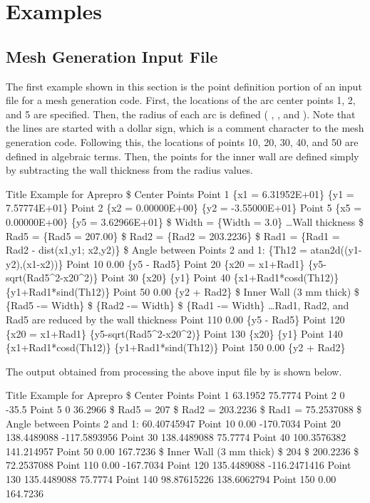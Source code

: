 \chapter{Examples}\label{ch:examples}

\section{Mesh Generation Input File}

The first example shown in this section is the point definition portion of an input 
file for a mesh generation code. First, the locations of the arc center points 
1, 2, and 5 are specified. Then, the radius of each arc is defined ( , 
, and ). Note that the lines are started with a dollar sign, which 
is a comment character to the mesh generation code. Following this, the locations 
of points 10, 20, 30, 40, and 50 are defined in algebraic terms. Then, the points 
for the inner wall are defined simply by subtracting the wall thickness from the 
radius values.
\begin{apinp}
Title          
Example for Aprepro     
\$  Center  Points        
Point  1  \{x1  =  6.31952E+01\}  \{y1  =  7.57774E+01\}
Point  2  \{x2  =  0.00000E+00\}  \{y2  =  -3.55000E+01\}
Point  5  \{x5  =  0.00000E+00\}  \{y5  =  3.62966E+01\}
\$  Width  =  \{Width  =  3.0\}      
\ldots Wall thickness
\$  Rad5  =  \{Rad5  =  207.00\}
\$  Rad2  =  \{Rad2  =  203.2236\}
\$  Rad1  =  \{Rad1  =  Rad2  -  dist(x1,y1;  x2,y2)\}
\$  Angle  between  Points  2  and  1:  \{Th12  =  atan2d((y1-y2),(x1-x2))\}
Point  10  0.00    \{y5  -  Rad5\}
Point  20  \{x20  =  x1+Rad1\}    \{y5-sqrt(Rad5\^{}2-x20\^{}2)\}
Point  30  \{x20\}    \{y1\}  
Point  40  \{x1+Rad1*cosd(Th12)\}  \{y1+Rad1*sind(Th12)\}
Point  50  0.00    \{y2  +  Rad2\}
\$  Inner Wall (3  mm  thick) 
\$  \{Rad5  -=  Width\}        
\$  \{Rad2  -=  Width\}        
\$  \{Rad1  -=  Width\}        
\ldots Rad1, Rad2, and Rad5 are reduced by the wall thickness
Point  110  0.00    \{y5  -  Rad5\}
Point  120  \{x20  =  x1+Rad1\}    \{y5-sqrt(Rad5\^{}2-x20\^{}2)\}
Point  130  \{x20\}    \{y1\}  
Point  140  \{x1+Rad1*cosd(Th12)\}  \{y1+Rad1*sind(Th12)\}
Point  150  0.00    \{y2  +  Rad2\}
\end{apinp}
The output obtained from processing the above input file by \aprepro{} is shown below.
\begin{apout}
Title          
Example for  Aprepro
\$  Center  Points
Point  1  63.1952  75.7774    
Point  2  0  -35.5    
Point  5  0  36.2966    
\$  Rad5  =  207
\$  Rad2  =  203.2236
\$  Rad1  =  75.2537088
\$  Angle between  Points  2  and  1:  60.40745947
Point  10  0.00  -170.7034
Point  20  138.4489088  -117.5893956
Point  30  138.4489088  75.7774
Point  40  100.3576382  141.214957
Point  50  0.00  167.7236
\$  Inner Wall  (3  mm  thick)
\$  204      
\$  200.2236   
\$  72.2537088
Point  110  0.00  -167.7034
Point  120  135.4489088  -116.2471416
Point  130  135.4489088  75.7774
Point  140  98.87615226  138.6062794
Point  150  0.00  164.7236
\end{apout}

